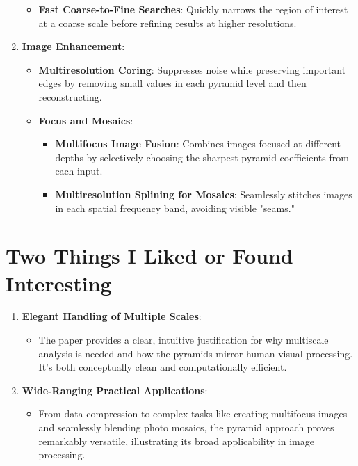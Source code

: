 \documentclass[12pt]{article}
\begin{document}
\begin{enumerate}[noitemsep]
\begin{itemize}[noitemsep]
        \item \textbf{Fast Coarse-to-Fine Searches}: Quickly narrows the region of interest at a coarse scale before refining results at higher resolutions.
    \end{itemize}
    \item \textbf{Image Enhancement}:
    \begin{itemize}[noitemsep]
        \item \textbf{Multiresolution Coring}: Suppresses noise while preserving important edges by removing small values in each pyramid level and then reconstructing.
        \item \textbf{Focus and Mosaics}:
        \begin{itemize}[noitemsep]
            \item \textbf{Multifocus Image Fusion}: Combines images focused at different depths by selectively choosing the sharpest pyramid coefficients from each input.
            \item \textbf{Multiresolution Splining for Mosaics}: Seamlessly stitches images in each spatial frequency band, avoiding visible "seams."
        \end{itemize}
    \end{itemize}
\end{enumerate}

\section{Two Things I Liked or Found Interesting}
\begin{enumerate}[noitemsep]
    \item \textbf{Elegant Handling of Multiple Scales}:
    \begin{itemize}[noitemsep]
        \item The paper provides a clear, intuitive justification for why multiscale analysis is needed and how the pyramids mirror human visual processing. It's both conceptually clean and computationally efficient.
    \end{itemize}
    \item \textbf{Wide-Ranging Practical Applications}:
    \begin{itemize}[noitemsep]
        \item From data compression to complex tasks like creating multifocus images and seamlessly blending photo mosaics, the pyramid approach proves remarkably versatile, illustrating its broad applicability in image processing.
    \end{itemize}
\end{enumerate}
\end{document}
